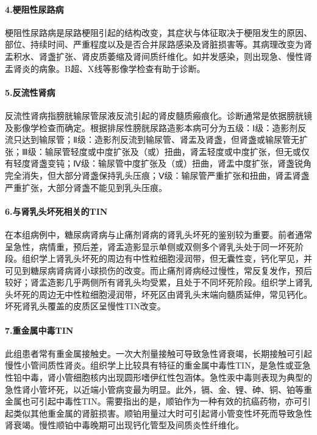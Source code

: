 \paragraph{4.梗阻性尿路病}

梗阻性尿路病是尿路梗阻引起的结构改变，其症状与体征取决于梗阻发生的原因、部位、持续时间、严重程度以及是否合并尿路感染及肾脏损害等。其病理改变为肾盂积水、肾盏扩张、肾皮质萎缩及肾间质纤维化。如并发感染，则出现急、慢性肾盂肾炎的病象。B超、X线等影像学检查有助于诊断。

\paragraph{5.反流性肾病}

反流性肾病指膀胱输尿管尿液反流引起的肾皮髓质瘢痕化。诊断通常是依据膀胱镜及影像学检查而确定。根据排尿性膀胱尿路造影本病可分为五级：Ⅰ级：造影剂反流只达到输尿管；Ⅱ级：造影剂反流到输尿管、肾盂及肾盏，但肾盏或输尿管无扩张；Ⅲ级：输尿管轻度或中度扩张及（或）扭曲，肾盂轻度或中度扩张，但无或仅有轻度肾盏变钝；Ⅳ级：输尿管中度扩张及（或）扭曲，肾盂中度扩张，肾盏锐角完全消失，但大部分肾盏保持乳头压痕；Ⅴ级：输尿管严重扩张和扭曲，肾盂肾盏严重扩张，大部分肾盏不能见到乳头压痕。

\paragraph{6.与肾乳头坏死相关的TIN}

在本组病例中，糖尿病肾病与止痛剂肾病的肾乳头坏死的鉴别较为重要。前者通常呈急性，病情重，预后差，肾盂造影显示单侧或双侧多个肾乳头处于同一坏死阶段。组织学上肾乳头坏死的周边有中性粒细胞浸润带，但无囊性变，钙化罕见，并可见到糖尿病肾病肾小球损伤的改变。而止痛剂肾病经过慢性，常反复发作，预后较好；肾盂造影几乎两侧所有肾乳头均受累，且处于不同坏死阶段。组织学上肾乳头坏死的周边无中性粒细胞浸润带，坏死区由肾乳头末端向髓质延伸，常见钙化。坏死肾乳头覆盖的皮质区呈慢性TIN改变。

\paragraph{7.重金属中毒TIN}

此组患者常有重金属接触史。一次大剂量接触可导致急性肾衰竭，长期接触可引起慢性小管间质性肾炎。组织学上比较具有特征的重金属中毒性TIN，是急性或亚急性铅中毒，肾小管细胞核内出现圆形嗜伊红性包涵体。急性汞中毒则表现为典型的急性肾小管坏死，以近端小管病变最为明显。此外，镉、金、锂、砷、铜、铂等重金属也可引起中毒性TIN。需要指出的是，顺铂作为一种有效的抗癌药物，亦可引起类似其他重金属的肾脏损害。顺铂用量过大时可引起肾小管变性坏死而导致急性肾衰竭。慢性顺铂中毒晚期可出现钙化管型及间质炎性纤维化。

